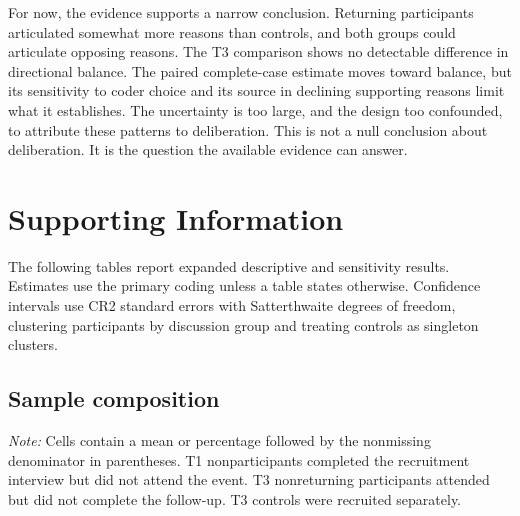 \documentclass[11pt]{article}
\begin{document}
For now, the evidence supports a narrow conclusion. Returning participants articulated
somewhat more reasons than controls, and both groups could articulate
opposing reasons. The T3 comparison shows no detectable difference in directional balance.
The paired complete-case estimate moves toward balance, but its sensitivity to coder choice and
its source in declining supporting reasons limit what it establishes. The uncertainty is too
large, and the design too confounded, to attribute these patterns to deliberation. This is not a
null conclusion about deliberation. It is the question the available evidence can answer.




\singlespacing
\normalsize
\setlength{\parindent}{0pt}
\setlength{\parskip}{6pt}
\appendix
\setcounter{section}{1}
\renewcommand{\thesection}{S}
\setcounter{table}{0}
\renewcommand{\thetable}{S\arabic{table}}
\label{sec:supplement}
\section*{Supporting Information}

The following tables report expanded descriptive and sensitivity results. Estimates use the
primary coding unless a table states otherwise. Confidence intervals use CR2 standard errors
with Satterthwaite degrees of freedom, clustering participants by discussion group and treating
controls as singleton clusters.

\subsection{Sample composition}

\begin{table}[H]
\centering
\caption{Composition of recruitment, participant, returnee, and control samples}

\begin{minipage}{0.95\textwidth}
\smallskip\footnotesize
\textit{Note:} Cells contain a mean or percentage followed by the nonmissing denominator in
parentheses. T1 nonparticipants completed the recruitment interview but did not attend the
event. T3 nonreturning participants attended but did not complete the follow-up. T3 controls
were recruited separately.
\end{minipage}
\end{table}
\end{document}
